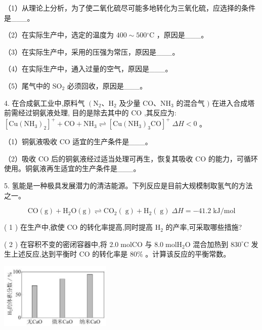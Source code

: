 \documentclass[10pt]{article}
\begin{document}
（1）从理论上分析，为了使二氧化硫尽可能多地转化为三氧化硫，应选择的条件是\_\_\_。

（2）在实际生产中，选定的温度为 \({400} \sim {500}{}^{ \circ }\mathrm{C}\) ，原因是\_\_\_。

（3）在实际生产中，采用的压强为常压，原因是\_\_\_。

（4）在实际生产中，通入过量的空气，原因是\_\_\_。

（5）尾气中的 \({\mathrm{{SO}}}_{2}\) 必须回收，原因是\_\_\_。

4. 在合成氨工业中,原料气 \(\left( {{\mathrm{N}}_{2}\text{、}{\mathrm{H}}_{2}}\right.\) 及少量 \(\mathrm{{CO}}\text{、}{\mathrm{{NH}}}_{3}\) 的混合气 \()\) 在进入合成塔前需经过铜氨液处理, 目的是除去其中的 \(\mathrm{{CO}}\) ,其反应为: \({\left\lbrack \mathrm{{Cu}}{\left( {\mathrm{{NH}}}_{3}\right) }_{2}\right\rbrack }^{ + } + \mathrm{{CO}} + {\mathrm{{NH}}}_{3} \rightleftharpoons {\left\lbrack \mathrm{{Cu}}{\left( {\mathrm{{NH}}}_{3}\right) }_{3}\mathrm{{CO}}\right\rbrack }^{ + }\;{\Delta H} < 0\) 。

（1）铜氨液吸收 \(\mathrm{{CO}}\) 适宜的生产条件是\_\_\_。

（2）吸收 \(\mathrm{{CO}}\) 后的铜氨液经过适当处理可再生，恢复其吸收 \(\mathrm{{CO}}\) 的能力，可循环使用。铜氨液再生适宜的生产条件是\_\_\_。

5. 氢能是一种极具发展潜力的清洁能源。下列反应是目前大规模制取氢气的方法之一。

\[
\mathrm{{CO}}\left( \mathrm{g}\right) + {\mathrm{H}}_{2}\mathrm{O}\left( \mathrm{g}\right) \rightleftharpoons {\mathrm{{CO}}}_{2}\left( \mathrm{\;g}\right) + {\mathrm{H}}_{2}\left( \mathrm{\;g}\right) \;{\Delta H} = - {41.2}\mathrm{\;{kJ}}/\mathrm{{mol}}
\]

( 1 ) 在生产中,欲使 \(\mathrm{{CO}}\) 的转化率提高,同时提高 \({\mathrm{H}}_{2}\) 的产率,可采取哪些措施?

( 2 ) 在容积不变的密闭容器中,将 \({2.0}\mathrm{\;{mol}}\mathrm{{CO}}\) 与 \({8.0}\mathrm{\;{mol}}{\mathrm{H}}_{2}\mathrm{O}\) 混合加热到 \({830}^{ \circ }\mathrm{C}\) 发生上述反应,达到平衡时 \(\mathrm{{CO}}\) 的转化率是 \({80}\%\) 。计算该反应的平衡常数。

\begin{center}
\includegraphics[max width=0.4\textwidth]{images/0190da9d-8bfd-732f-bc2c-0b21d0f13b91_56_797676.jpg}
\end{center}
\end{document}

